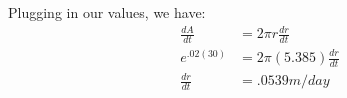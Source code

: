 \documentclass{ximera}
\begin{document}
\begin{exercise}
\begin{hint}
Plugging in our values, we have: \begin{align*}
\frac{dA}{dt} &= 2\pi r \frac{dr}{dt} \\
e^{.02(30)} &= 2\pi (5.385) \frac{dr}{dt} \\
\frac{dr}{dt} &= .0539 m/day
\end{align*}
\end{hint}


\begin{multipleChoice}
\end{multipleChoice}

\end{exercise}
\end{document}
